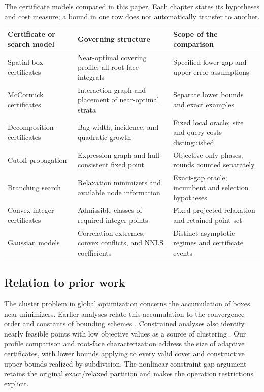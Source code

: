 \begin{table}[t]
\centering
\small
\setlength{\tabcolsep}{4pt}
\renewcommand{\arraystretch}{1.12}
\begin{tabular}{@{}p{}p{}p{}@{}}
\toprule
Certificate or search model & Governing structure & Scope of the comparison \\
\midrule
Spatial box certificates & Near-optimal covering profile; all root-face
integrals & Specified lower gap and upper-error assumptions \\
McCormick certificates & Interaction graph and placement of near-optimal
strata & Separate lower bounds and exact examples \\
Decomposition certificates & Bag width, incidence, and quadratic growth &
Fixed local oracle; size and query costs distinguished \\
Cutoff propagation & Expression graph and hull-consistent fixed point &
Objective-only phases; rounds counted separately \\
Branching search & Relaxation minimizers and available node information &
Exact-gap oracle; incumbent and selection hypotheses \\
Convex integer certificates & Admissible classes of required integer points &
Fixed projected relaxation and retained point set \\
Gaussian models & Correlation extremes, convex conflicts, and NNLS
coefficients & Distinct asymptotic regimes and certificate events \\
\bottomrule
\end{tabular}
\caption{The certificate models compared in this paper. Each chapter states
its hypotheses and cost measure; a bound in one row does not automatically
transfer to another.}
\label{intro:tab-models}
\end{table}

\subsection{Relation to prior work}\label{intro:prior}

The cluster problem in global optimization concerns the accumulation of
boxes near minimizers. Earlier analyses relate this accumulation to the
convergence order and constants of bounding schemes
\citep{duKearfott1994Cluster,wechsungSchaberBarton2014Cluster}.
Constrained analyses also identify nearly feasible points with low objective
values as a source of clustering
\citep{kannanBarton2017ConstrainedCluster}.
Our profile comparison and root-face characterization address the size of
adaptive certificates, with lower bounds applying to every valid cover and
constructive upper bounds realized by subdivision. The nonlinear
constraint-gap argument retains the original exact/relaxed partition and
makes the operation restrictions explicit.

